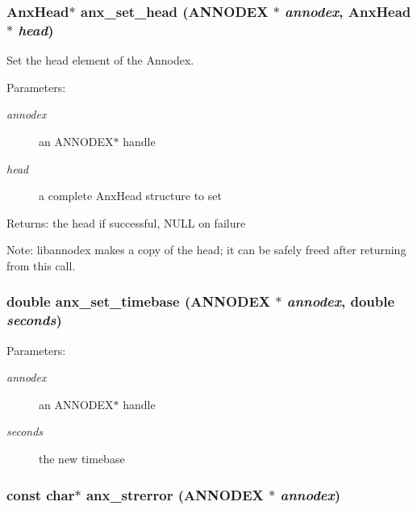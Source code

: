 \subsubsection{\setlength{\rightskip}{0pt plus 5cm}Anx\-Head$\ast$ anx\_\-set\_\-head ({\bf ANNODEX} $\ast$ {\em annodex}, Anx\-Head $\ast$ {\em head})}\label{anx__general_8h_a11}


Set the head element of the Annodex. 

\begin{Desc}
\item[Parameters:]
\begin{description}
\item[{\em annodex}]an ANNODEX$\ast$ handle \item[{\em head}]a complete Anx\-Head structure to set \end{description}
\end{Desc}
\begin{Desc}
\item[Returns:]the head if successful, NULL on failure \end{Desc}
\begin{Desc}
\item[Note:]libannodex makes a copy of the head; it can be safely freed after returning from this call. \end{Desc}
\subsubsection{\setlength{\rightskip}{0pt plus 5cm}double anx\_\-set\_\-timebase ({\bf ANNODEX} $\ast$ {\em annodex}, double {\em seconds})}\label{anx__general_8h_a16}


\begin{Desc}
\item[Parameters:]
\begin{description}
\item[{\em annodex}]an ANNODEX$\ast$ handle \item[{\em seconds}]the new timebase \end{description}
\end{Desc}
\subsubsection{\setlength{\rightskip}{0pt plus 5cm}const char$\ast$ anx\_\-strerror ({\bf ANNODEX} $\ast$ {\em annodex})}\label{anx__general_8h_a2}


